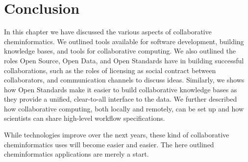 \documentclass[11pt]{book}
\begin{document}
\section{Conclusion}

In this chapter we have discussed the various aspects of collaborative
cheminformatics. We outlined tools available for software development,
building knowledge bases, and tools for collaborative computing.
We also outlined the roles Open Source, Open Data, and Open Standards
have in building successful collaborations, such as the roles of
licensing as social contract between collaborators, and communication
channels to discuss ideas. Similarly, we shows how Open Standards
make it easier to build collaborative knowledge bases as they
provide a unified, clear-to-all interface to the data. We further
described how collaborative computing, both locally and
remotely, can be set up and how scientists can share high-level
workflow specifications.

While technologies improve over the next years, these kind of
collaborative cheminformatics uses will become easier and easier.
The here outlined cheminformatics applications are merely a start.



\end{document}
